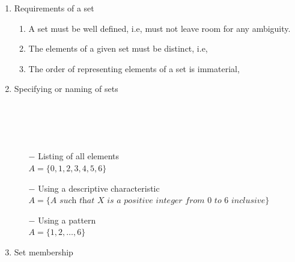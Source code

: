 \documentclass[12pt]{report}
\begin{document}
        \begin{enumerate}
            \item Requirements of a set \\
                \begin{enumerate}
                    \item A set must be well defined, i.e, must not leave room for any ambiguity.
                    \item The elements of a given set must be distinct, i.e,\\
                    \item The order of representing elements of a set is immaterial,\\
                \end{enumerate}
            \item Specifying or naming of sets \\
                \\ 
                \\ 
                 \\
                 \\
                \begin{itemize}
                    \item[$-$] Listing of all elements \\
                    $ A = \{0,1,2,3,4,5,6\}$
                    \item[$-$] Using a descriptive characteristic \\
                    $ A = \{\textit{A such that X is a positive integer from 0 to 6 inclusive} \} $
                    \item[$-$] Using a pattern \\
                    $ A = \{1,2,\ldots,6\}$
                \end{itemize}
            \item Set membership \\
                \\

\end{enumerate}
\end{document}
